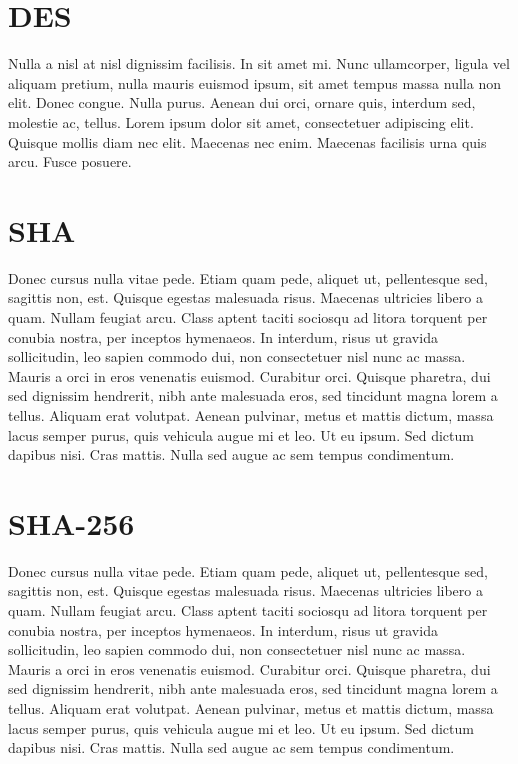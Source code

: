 \documentclass[oneside]{mgr}
\begin{document}
\chapter{DES}
Nulla a nisl at nisl dignissim facilisis. In sit amet mi. Nunc
ullamcorper, ligula vel aliquam pretium, nulla mauris euismod ipsum,
sit amet tempus massa nulla non elit. Donec congue. Nulla
purus. Aenean dui orci, ornare quis, interdum sed, molestie ac,
tellus. Lorem ipsum dolor sit amet, consectetuer adipiscing
elit. Quisque mollis diam nec elit. Maecenas nec enim. Maecenas
facilisis urna quis arcu. Fusce posuere.


\appendix
\chapter{SHA}
Donec cursus nulla vitae pede. Etiam quam pede, aliquet ut,
pellentesque sed, sagittis non, est. Quisque egestas malesuada
risus. Maecenas ultricies libero a quam. Nullam feugiat arcu. Class
aptent taciti sociosqu ad litora torquent per conubia nostra, per
inceptos hymenaeos. In interdum, risus ut gravida sollicitudin, leo
sapien commodo dui, non consectetuer nisl nunc ac massa. Mauris a orci
in eros venenatis euismod. Curabitur orci. Quisque pharetra, dui sed
dignissim hendrerit, nibh ante malesuada eros, sed tincidunt magna
lorem a tellus. Aliquam erat volutpat. Aenean pulvinar, metus et
mattis dictum, massa lacus semper purus, quis vehicula augue mi et
leo. Ut eu ipsum. Sed dictum dapibus nisi. Cras mattis. Nulla sed
augue ac sem tempus condimentum.

\chapter{SHA-256}
Donec cursus nulla vitae pede. Etiam quam pede, aliquet ut,
pellentesque sed, sagittis non, est. Quisque egestas malesuada
risus. Maecenas ultricies libero a quam. Nullam feugiat arcu. Class
aptent taciti sociosqu ad litora torquent per conubia nostra, per
inceptos hymenaeos. In interdum, risus ut gravida sollicitudin, leo
sapien commodo dui, non consectetuer nisl nunc ac massa. Mauris a orci
in eros venenatis euismod. Curabitur orci. Quisque pharetra, dui sed
dignissim hendrerit, nibh ante malesuada eros, sed tincidunt magna
lorem a tellus. Aliquam erat volutpat. Aenean pulvinar, metus et
mattis dictum, massa lacus semper purus, quis vehicula augue mi et
leo. Ut eu ipsum. Sed dictum dapibus nisi. Cras mattis. Nulla sed
augue ac sem tempus condimentum.




\end{document}
